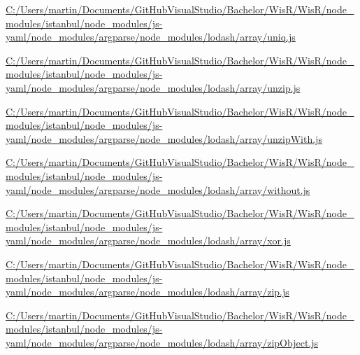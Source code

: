 \begin{DoxyCompactItemize}
\item 
\hyperlink{_c_1_2_users_2martin_2_documents_2_git_hub_visual_studio_2_bachelor_2_wis_r_2_wis_r_2node_module638be6c3affc7d0327e993b4deba116a}{C\+:/\+Users/martin/\+Documents/\+Git\+Hub\+Visual\+Studio/\+Bachelor/\+Wis\+R/\+Wis\+R/node\+\_\+modules/istanbul/node\+\_\+modules/js-\/yaml/node\+\_\+modules/argparse/node\+\_\+modules/lodash/array/uniq.\+js}
\item 
\hyperlink{_c_1_2_users_2martin_2_documents_2_git_hub_visual_studio_2_bachelor_2_wis_r_2_wis_r_2node_module5e1e4a53e0917e59e06895f35bf4cbbf}{C\+:/\+Users/martin/\+Documents/\+Git\+Hub\+Visual\+Studio/\+Bachelor/\+Wis\+R/\+Wis\+R/node\+\_\+modules/istanbul/node\+\_\+modules/js-\/yaml/node\+\_\+modules/argparse/node\+\_\+modules/lodash/array/unzip.\+js}
\item 
\hyperlink{_c_1_2_users_2martin_2_documents_2_git_hub_visual_studio_2_bachelor_2_wis_r_2_wis_r_2node_moduled3f4649f1d13ab701256cd7ab45cacfc}{C\+:/\+Users/martin/\+Documents/\+Git\+Hub\+Visual\+Studio/\+Bachelor/\+Wis\+R/\+Wis\+R/node\+\_\+modules/istanbul/node\+\_\+modules/js-\/yaml/node\+\_\+modules/argparse/node\+\_\+modules/lodash/array/unzip\+With.\+js}
\item 
\hyperlink{_c_1_2_users_2martin_2_documents_2_git_hub_visual_studio_2_bachelor_2_wis_r_2_wis_r_2node_module615011524b7e5fdeb8a642a0dd7d4d3a}{C\+:/\+Users/martin/\+Documents/\+Git\+Hub\+Visual\+Studio/\+Bachelor/\+Wis\+R/\+Wis\+R/node\+\_\+modules/istanbul/node\+\_\+modules/js-\/yaml/node\+\_\+modules/argparse/node\+\_\+modules/lodash/array/without.\+js}
\item 
\hyperlink{_c_1_2_users_2martin_2_documents_2_git_hub_visual_studio_2_bachelor_2_wis_r_2_wis_r_2node_module529aac8bcb9ddbaeaf3fa32a1f314c2e}{C\+:/\+Users/martin/\+Documents/\+Git\+Hub\+Visual\+Studio/\+Bachelor/\+Wis\+R/\+Wis\+R/node\+\_\+modules/istanbul/node\+\_\+modules/js-\/yaml/node\+\_\+modules/argparse/node\+\_\+modules/lodash/array/xor.\+js}
\item 
\hyperlink{_c_1_2_users_2martin_2_documents_2_git_hub_visual_studio_2_bachelor_2_wis_r_2_wis_r_2node_module7d687862e341b1face76b98d07279e22}{C\+:/\+Users/martin/\+Documents/\+Git\+Hub\+Visual\+Studio/\+Bachelor/\+Wis\+R/\+Wis\+R/node\+\_\+modules/istanbul/node\+\_\+modules/js-\/yaml/node\+\_\+modules/argparse/node\+\_\+modules/lodash/array/zip.\+js}
\item 
\hyperlink{_c_1_2_users_2martin_2_documents_2_git_hub_visual_studio_2_bachelor_2_wis_r_2_wis_r_2node_modulec2e82c9d6cec3461910a097dc32c5509}{C\+:/\+Users/martin/\+Documents/\+Git\+Hub\+Visual\+Studio/\+Bachelor/\+Wis\+R/\+Wis\+R/node\+\_\+modules/istanbul/node\+\_\+modules/js-\/yaml/node\+\_\+modules/argparse/node\+\_\+modules/lodash/array/zip\+Object.\+js}

\end{DoxyCompactItemize}
